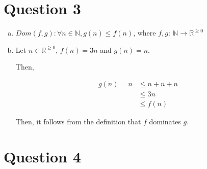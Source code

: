 \documentclass[12pt]{article}
\begin{document}
\section*{Question 3}
\begin{enumerate}[a.]
    \item

    $Dom(f,g):\forall n \in \mathbb{N}, g(n) \leq f(n)$, where $f,g:\:\mathbb{N} \to \mathbb{R}^{\geq0}$

    \item

    Let $n \in \mathbb{R}^{\geq0}$, $f(n) = 3n$ and $g(n) = n$.

    \bigskip

    Then,

    \begin{align}
        g(n) = n &\leq n + n + n\\
        &\leq 3n\\
        &\leq f(n)
    \end{align}

    \bigskip

    Then, it follows from the definition that $f$ dominates $g$.

\end{enumerate}

\section*{Question 4}
\end{document}
